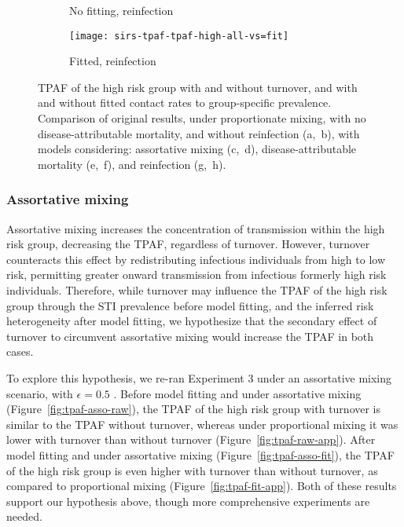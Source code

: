 \begin{figure}[!tbp]
\begin{subfigure}{0.35\linewidth}
    \caption{No fitting, reinfection}
    \label{fig:tpaf-sirs-raw}
  \end{subfigure}
  \begin{subfigure}{0.35\linewidth}
    \centering\texttt{[image: sirs-tpaf-tpaf-high-all-vs=fit]}
    \caption{Fitted, reinfection}
    \label{fig:tpaf-sirs-fit}
  \end{subfigure}
  \caption{TPAF of the high risk group with and without turnover,
    and with and without fitted contact rates to group-specific prevalence.
    Comparison of original results,
    under proportionate mixing,
    with no disease-attributable mortality,
    and without reinfection (a,~b),
    with models considering:
    assortative mixing (c,~d),
    disease-attributable mortality (e,~f),
    and reinfection (g,~h).}
  \label{fig:tpaf-app}
\end{figure}
\subsubsection{Assortative mixing}\label{aaa:what-if-asso}
Assortative mixing increases the concentration of transmission within the high risk group,
decreasing the TPAF, regardless of turnover.
However, turnover counteracts this effect by
redistributing infectious individuals from high to low risk,
permitting greater onward transmission from
infectious formerly high risk individuals.
Therefore,
while turnover may influence the TPAF of the high risk group through
the STI prevalence before model fitting, and
the inferred risk heterogeneity after model fitting,
we hypothesize that
the secondary effect of turnover to circumvent assortative mixing
would increase the TPAF in both cases.
\par
To explore this hypothesis,
we re-ran Experiment 3 under an assortative mixing scenario,
with $\epsilon = 0.5$ \citep{Nold1980}.
Before model fitting and under assortative mixing
(Figure~\ref{fig:tpaf-asso-raw}),
the TPAF of the high risk group with turnover
is similar to the TPAF without turnover,
whereas under proportional mixing it was lower with turnover than without turnover
(Figure~\ref{fig:tpaf-raw-app}).
After model fitting and under assortative mixing
(Figure~\ref{fig:tpaf-asso-fit}),
the TPAF of the high risk group is even higher with turnover than without turnover,
as compared to proportional mixing
(Figure~\ref{fig:tpaf-fit-app}).
Both of these results support our hypothesis above,
though more comprehensive experiments are needed.
